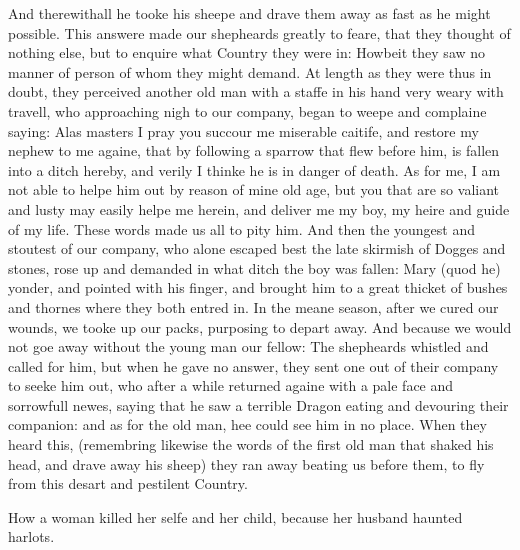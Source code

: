 And therewithall he tooke his sheepe and drave them away as fast as he might
possible. This answere made our shepheards greatly to feare, that they thought
of nothing else, but to enquire what Country they were in: Howbeit they saw no
manner of person of whom they might demand. At length as they were thus in
doubt, they perceived another old man with a staffe in his hand very weary with
travell, who approaching nigh to our company, began to weepe and complaine
saying: Alas masters I pray you succour me miserable caitife, and restore my
nephew to me againe, that by following a sparrow that flew before him, is
fallen into a ditch hereby, and verily I thinke he is in danger of death. As
for me, I am not able to helpe him out by reason of mine old age, but you that
are so valiant and lusty may easily helpe me herein, and deliver me my boy, my
heire and guide of my life. These words made us all to pity him. And then the
youngest and stoutest of our company, who alone escaped best the late skirmish
of Dogges and stones, rose up and demanded in what ditch the boy was fallen:
Mary (quod he) yonder, and pointed with his finger, and brought him to a great
thicket of bushes and thornes where they both entred in. In the meane season,
after we cured our wounds, we tooke up our packs, purposing to depart away. And
because we would not goe away without the young man our fellow: The shepheards
whistled and called for him, but when he gave no answer, they sent one out of
their company to seeke him out, who after a while returned againe with a pale
face and sorrowfull newes, saying that he saw a terrible Dragon eating and
devouring their companion: and as for the old man, hee could see him in no
place. When they heard this, (remembring likewise the words of the first old
man that shaked his head, and drave away his sheep) they ran away beating us
before them, to fly from this desart and pestilent Country.


How a woman killed her selfe and her child, because her husband haunted
harlots.

